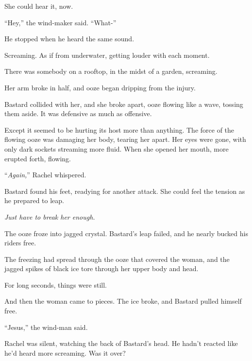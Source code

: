 She could hear it, now.



``Hey,'' the wind-maker said.  ``What-''



He stopped when he heard the same sound.



Screaming.  As if from underwater, getting louder with each moment.



There was somebody on a rooftop, in the midst of a garden, screaming.



Her arm broke in half, and ooze began dripping from the injury.



Bastard collided with her, and she broke apart, ooze flowing like a wave, tossing them aside.  It was defensive as much as offensive.



Except it seemed to be hurting its host more than anything.  The force of the flowing ooze was damaging her body, tearing her apart.  Her eyes were gone, with only dark sockets streaming more fluid.  When she opened her mouth, more erupted forth, flowing.



``\emph{Again,}'' Rachel whispered.



Bastard found his feet, readying for another attack.  She could feel the tension as he prepared to leap.



\emph{Just have to break her enough.}



The ooze froze into jagged crystal.  Bastard's leap failed, and he nearly bucked his riders free.



The freezing had spread through the ooze that covered the woman, and the jagged spikes of black ice tore through her upper body and head.



For long seconds, things were still.



And then the woman came to pieces.  The ice broke, and Bastard pulled himself free.



``Jesus,'' the wind-man said.



Rachel was silent, watching the back of Bastard's head.  He hadn't reacted like he'd heard more screaming.  Was it over?



